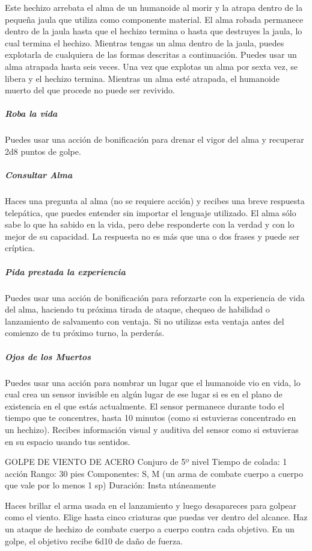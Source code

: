 \documentclass[a4paper,twocolumn,openany,10pt]{dndbook}
\begin{document}
	Este hechizo arrebata el alma de un humanoide al morir y la atrapa dentro de la pequeña jaula que utiliza como componente
	material. El alma robada permanece dentro de la jaula hasta que el hechizo termina o hasta que destruyes la jaula, lo cual
	termina el hechizo. Mientras tengas un alma dentro de la jaula, puedes explotarla de cualquiera de las formas descritas a
	continuación. Puedes usar un alma atrapada hasta seis veces. Una vez que explotas un alma por sexta vez, se libera y el
	hechizo termina. Mientras un alma esté atrapada, el humanoide muerto del que procede no puede ser revivido.
	
	\subparagraph{Roba la vida} Puedes usar una acción de bonificación para drenar el vigor del alma y recuperar 2d8 puntos de
	golpe.

	\subparagraph{Consultar Alma} Haces una pregunta al alma (no se requiere acción) y recibes una breve respuesta telepática,
	que puedes entender sin importar el lenguaje utilizado. El alma sólo sabe lo que ha sabido en la vida, pero debe responderte
	con la verdad y con lo mejor de su capacidad. La respuesta no es más que una o dos frases y puede ser críptica.

	\subparagraph{Pida prestada la experiencia} Puedes usar una acción de bonificación para reforzarte con la experiencia de
	vida del alma, haciendo tu próxima tirada de ataque, chequeo de habilidad o lanzamiento de salvamento con ventaja. Si no
	utilizas esta ventaja antes del comienzo de tu próximo turno, la perderás. 

	\subparagraph{Ojos de los Muertos} Puedes usar una acción para nombrar un lugar que el humanoide vio en vida, lo cual crea
	un sensor invisible en algún lugar de ese lugar si es en el plano de existencia en el que estás actualmente. El sensor
	permanece durante todo el tiempo que te concentres, hasta 10 minutos (como si estuvieras concentrado en un hechizo). Recibes
	información visual y auditiva del sensor como si estuvieras en su espacio usando tus sentidos.
	
	GOLPE DE VIENTO DE ACERO
Conjuro de 5º nivel
Tiempo de colada: 1 acción
Rango: 30 pies
Componentes: S, M (un arma de combate cuerpo a cuerpo que vale por lo menos 1 sp)
Duración: Insta ntáneamente

Haces brillar el arma usada en el lanzamiento y luego desapareces para golpear como el viento. Elige hasta cinco criaturas que puedas ver dentro del alcance. Haz un ataque de hechizo de combate cuerpo a cuerpo contra cada objetivo. En un golpe, el objetivo recibe 6d10 de daño de fuerza.
\end{document}
